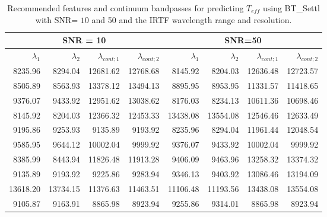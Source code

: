 \begin{appendix}
\begin{table*}
\begin{center}
\begin{tabular}{rrrr | rrrr}
  \hline
 \multicolumn{4}{c}{SNR = 10} &  \multicolumn{4}{c}{SNR=50} \\
  \hline
$\lambda_1$ & $\lambda_2$ & $\lambda_{cont;1}$ & $\lambda_{cont;2} $ & $\lambda_1$ & $\lambda_2$ & $\lambda_{cont;1}$ & $\lambda_{cont;2} $ \\ 
  \hline
8235.96  & 8294.04   & 12681.62 & 12768.68   &  8145.92 & 8204.03   & 12636.48 & 12723.57 \\   
8505.89  & 8563.93   & 13378.12 & 13494.13   &  8895.95 & 8953.95   & 11331.57 & 11418.65 \\     
9376.07  & 9433.92   & 12951.62 & 13038.62   &  8176.03 & 8234.13   & 10611.36 & 10698.46 \\      
8145.92  & 8204.03   & 12366.32 & 12453.33   &  13438.08 & 13554.08 & 12546.46 & 12633.49 \\     
9195.86  & 9253.93   & 9135.89 & 9193.92     &  8235.96 & 8294.04   & 11961.44 & 12048.54 \\      
9585.95  & 9644.12   & 10002.04 & 9999.92    &  9376.07 & 9433.92   & 10002.04 & 9999.92  \\   
8385.99  & 8443.94   & 11826.48 & 11913.28   &  9406.09 & 9463.96   & 13258.32 & 13374.32 \\    
9135.89  & 9193.92   & 9225.86 & 9283.94     &  9346.13 & 9403.92   & 13086.46 & 13194.09 \\   
13618.20 & 13734.15  & 11376.63 & 11463.51   &  11106.48 & 11193.56 & 13438.08 & 13554.08 \\    
9105.87  & 9163.91   & 8865.98 & 8923.94     &  9255.86 & 9314.01   & 8865.98  & 8923.94  \\    
\hline
\end{tabular}
\caption {Recommended features and continuum bandpasses for predicting
  $ T_{eff} $ using BT\_Settl with SNR= $ 10 $ and 50 and the IRTF
  wavelength range and resolution.} \label{tab:irtf-teff-noisy}
\end{center}
\end{table*}


\end{appendix}
